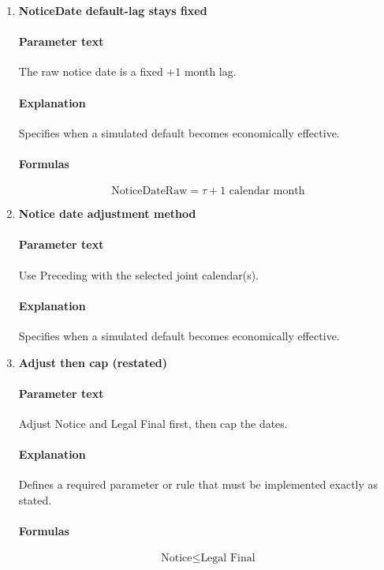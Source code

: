 \documentclass[11pt]{article}
\begin{document}
\begin{enumerate}[label=\arabic*),leftmargin=*,align=left]
\paragraph{Explanation} Specifies when a simulated default becomes economically effective.

\item \textbf{NoticeDate default-lag stays fixed}
\paragraph{Parameter text} The raw notice date is a fixed $+1$ month lag.
\paragraph{Explanation} Specifies when a simulated default becomes economically effective.
\paragraph{Formulas} 
\[ \text{NoticeDateRaw} = \tau + 1 \text{ calendar month} \]

\item \textbf{Notice date adjustment method}
\paragraph{Parameter text} Use Preceding with the selected joint calendar(s).
\paragraph{Explanation} Specifies when a simulated default becomes economically effective.

\item \textbf{Adjust then cap (restated)}
\paragraph{Parameter text} Adjust Notice and Legal Final first, then cap the dates.
\paragraph{Explanation} Defines a required parameter or rule that must be implemented exactly as stated.
\paragraph{Formulas} 
\[ \text{Notice} \le \text{Legal Final} \]


\end{enumerate}
\end{document}
